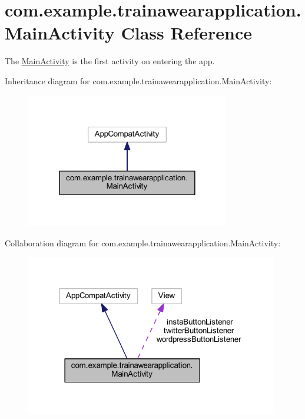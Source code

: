 \hypertarget{classcom_1_1example_1_1trainawearapplication_1_1_main_activity}{}\section{com.\+example.\+trainawearapplication.\+Main\+Activity Class Reference}
\label{classcom_1_1example_1_1trainawearapplication_1_1_main_activity}


The \mbox{\hyperlink{classcom_1_1example_1_1trainawearapplication_1_1_main_activity}{Main\+Activity}} is the first activity on entering the app.  




Inheritance diagram for com.\+example.\+trainawearapplication.\+Main\+Activity\+:
\nopagebreak
\begin{figure}[H]
\begin{center}
\leavevmode
\includegraphics[width=252pt]{classcom_1_1example_1_1trainawearapplication_1_1_main_activity__inherit__graph}
\end{center}
\end{figure}


Collaboration diagram for com.\+example.\+trainawearapplication.\+Main\+Activity\+:
\nopagebreak
\begin{figure}[H]
\begin{center}
\leavevmode
\includegraphics[width=312pt]{classcom_1_1example_1_1trainawearapplication_1_1_main_activity__coll__graph}
\end{center}
\end{figure}
